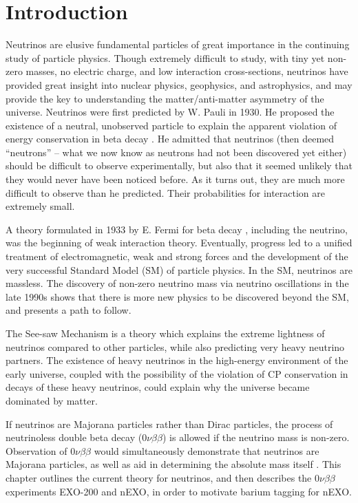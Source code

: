 \chapter{Introduction}

Neutrinos are elusive fundamental particles of great importance in the continuing study of particle physics.  Though extremely difficult to study, with tiny yet non-zero masses, no electric charge, and low interaction cross-sections, neutrinos have provided great insight into nuclear physics, geophysics, and astrophysics, and may provide the key to understanding the matter/anti-matter asymmetry of the universe.  Neutrinos were first predicted by W. Pauli in 1930.  He proposed the existence of a neutral, unobserved particle to explain the apparent violation of energy conservation in beta decay \cite{betaspectrum}. He admitted that neutrinos (then deemed ``neutrons'' -- what we now know as neutrons had not been discovered yet either) should be difficult to observe experimentally, but also that it seemed unlikely that they would never have been noticed before.  As it turns out, they are much more difficult to observe than he predicted.  Their probabilities for interaction are extremely small.

A theory formulated in 1933 by E. Fermi for beta decay \cite{FermiBetaDecay}, including the neutrino, was the beginning of weak interaction theory.  Eventually, progress led to a unified treatment of electromagnetic, weak and strong forces and the development of the very successful Standard Model (SM) of particle physics.  In the SM, neutrinos are massless.  The discovery of non-zero neutrino mass via neutrino oscillations in the late 1990s \cite{SuperK} shows that there is more new physics to be discovered beyond the SM, and presents a path to follow.

The See-saw Mechanism is a theory which explains the extreme lightness of neutrinos compared to other particles, while also predicting very heavy neutrino partners.  The existence of heavy neutrinos in the high-energy environment of the early universe, coupled with the possibility of the violation of CP conservation in decays of these heavy neutrinos, could explain why the universe became dominated by matter.  
\cite{SeeSaw}

If neutrinos are Majorana particles rather than Dirac particles, the process of neutrinoless double beta decay ($0\nu\beta\beta$) is allowed if the neutrino mass is non-zero.  Observation of $0\nu\beta\beta$ would simultaneously demonstrate that neutrinos are Majorana particles, as well as aid in determining the absolute mass itself \cite{effectiveMass}.  This chapter outlines the current theory for neutrinos, and then describes the $0\nu\beta\beta$ experiments EXO-200 and nEXO, in order to motivate barium tagging for nEXO.

